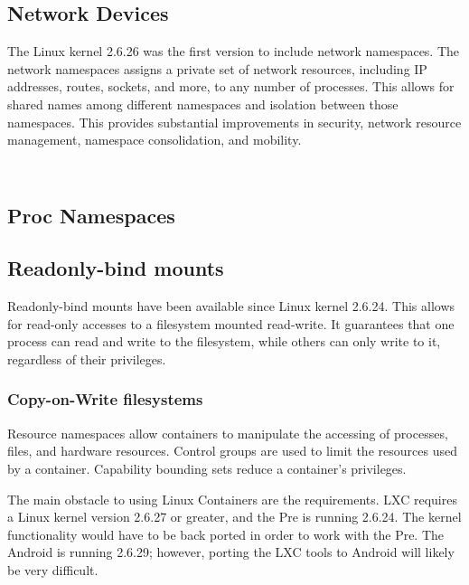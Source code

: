 \subsection{Network Devices}The Linux kernel 2.6.26 was the first version to include network namespaces.  The network namespaces assigns a private set of network resources, including IP addresses, routes, sockets, and more, to any number of processes.  This allows for shared names among different namespaces and isolation between those namespaces.  This provides substantial improvements in security, network resource management, namespace consolidation, and mobility.

\subsection{\\Proc Namespaces}

\subsection{Readonly-bind mounts}
Readonly-bind mounts have been available since Linux kernel 2.6.24.  This allows for read-only accesses to a filesystem mounted read-write.  It guarantees that one process can read and write to the filesystem, while others can only write to it, regardless of their privileges.

\subsubsection{Copy-on-Write filesystems}

Resource namespaces allow containers to manipulate the accessing of processes, files, and hardware resources.  Control groups are used to limit the resources used by a container.  Capability bounding sets reduce a container's privileges.  

The main obstacle to using Linux Containers are the requirements.  LXC requires a Linux kernel version 2.6.27 or greater, and the Pre is running 2.6.24.  The kernel functionality would have to be back ported in order to work with the Pre.  The Android is running 2.6.29; however, porting the LXC tools to Android will likely be very difficult.
